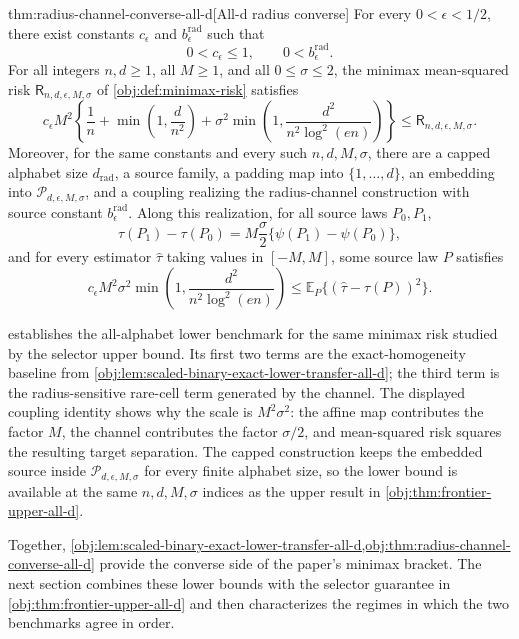 \documentclass[11pt]{article}
\begin{document}
\begin{theoremv}{thm:radius-channel-converse-all-d}[All-d radius converse]
For every \(0<\epsilon<1/2\), there exist constants \(c_{\epsilon}\) and \(b_{\epsilon}^{\mathrm{rad}}\) such that
\[
0<c_{\epsilon}\le 1,
\qquad
0<b_{\epsilon}^{\mathrm{rad}}.
\]
For all integers \(n,d\ge 1\), all \(M\ge 1\), and all \(0\le \sigma\le 2\), the minimax mean-squared risk \(\mathsf R_{n,d,\epsilon,M,\sigma}\) of \cref{obj:def:minimax-risk} satisfies
\[
c_{\epsilon}M^2
\left\{
\frac1n+\min\left(1,\frac d{n^2}\right)
+\sigma^2\min\left(1,\frac{d^2}{n^2\log^2(en)}\right)
\right\}
\le
\mathsf R_{n,d,\epsilon,M,\sigma}.
\]
Moreover, for the same constants and every such \(n,d,M,\sigma\), there are a capped alphabet size \(d_{\mathrm{rad}}\), a source family, a padding map into \(\{1,\ldots,d\}\), an embedding into \(\mathcal P_{d,\epsilon,M,\sigma}\), and a coupling realizing the radius-channel construction with source constant \(b_{\epsilon}^{\mathrm{rad}}\). Along this realization, for all source laws \(P_0,P_1\),
\[
\tau(P_1)-\tau(P_0)
=
M\frac{\sigma}{2}
\{\psi(P_1)-\psi(P_0)\},
\]
and for every estimator \(\widehat\tau\) taking values in \([-M,M]\), some source law \(P\) satisfies
\[
c_{\epsilon}M^2\sigma^2
\min\left(1,\frac{d^2}{n^2\log^2(en)}\right)
\le
\mathbb E_P\{(\widehat\tau-\tau(P))^2\}.
\]
\end{theoremv}

 establishes the all-alphabet lower benchmark for the same minimax risk studied by the selector upper bound. Its first two terms are the exact-homogeneity baseline from \cref{obj:lem:scaled-binary-exact-lower-transfer-all-d}; the third term is the radius-sensitive rare-cell term generated by the channel. The displayed coupling identity shows why the scale is \(M^2\sigma^2\): the affine map contributes the factor \(M\), the channel contributes the factor \(\sigma/2\), and mean-squared risk squares the resulting target separation. The capped construction keeps the embedded source inside \(\mathcal P_{d,\epsilon,M,\sigma}\) for every finite alphabet size, so the lower bound is available at the same \(n,d,M,\sigma\) indices as the upper result in \cref{obj:thm:frontier-upper-all-d}.

Together, \cref{obj:lem:scaled-binary-exact-lower-transfer-all-d,obj:thm:radius-channel-converse-all-d} provide the converse side of the paper's minimax bracket. The next section combines these lower bounds with the selector guarantee in \cref{obj:thm:frontier-upper-all-d} and then characterizes the regimes in which the two benchmarks agree in order.
\end{document}
